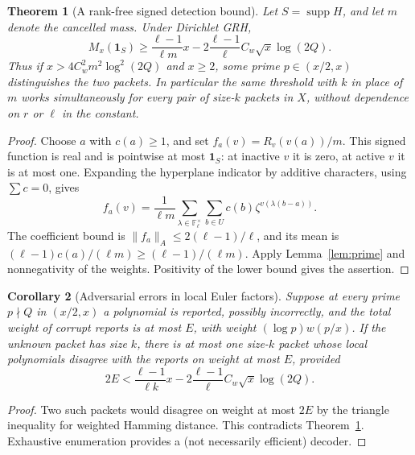 \documentclass[11pt]{article}
\newtheorem{theorem}{Theorem}[section]
\newtheorem{corollary}[theorem]{Corollary}
\theoremstyle{remark}\newtheorem{remark}[theorem]{Remark}
\newcommand{\F}{\mathbb F}
\newcommand{\supp}{\operatorname{supp}}
\newcommand{\ind}{\mathbf 1}
\begin{document}
\begin{theorem}[A rank-free signed detection bound]\label{thm:finite}
Let $S=\supp H$, and let $m$ denote the cancelled mass. Under Dirichlet GRH,
\begin{equation}\label{eq:finite}
 M_x(\ind_S)\ge \frac{\ell-1}{\ell m}x-2\frac{\ell-1}{\ell}C_w\sqrt x\log(2Q).
\end{equation}
Thus if $x>4 C_w^2m^2\log^2(2Q)$ and $x\ge2$, some prime $p\in(x/2,x)$ distinguishes the two packets. In particular the same threshold with $k$ in place of $m$ works simultaneously for every pair of size-$k$ packets in $X$, without dependence on $r$ or $\ell$ in the constant.
\end{theorem}
\begin{proof}
Choose $a$ with $c(a)\ge1$, and set $f_a(v)=R_v(v(a))/m$. This signed function is real and is pointwise at most $\ind_S$: at inactive $v$ it is zero, at active $v$ it is at most one. Expanding the hyperplane indicator by additive characters, using $\sum c=0$, gives
\[
 f_a(v)=\frac1{\ell m}\sum_{\lambda\in\F_\ell^\times}\sum_{b\in U}c(b)\zeta^{v(\lambda(b-a))}.
\]
The coefficient bound is $\|f_a\|_A\le 2(\ell-1)/\ell$, and its mean is $(\ell-1)c(a)/(\ell m)\ge(\ell-1)/(\ell m)$. Apply Lemma~\ref{lem:prime} and nonnegativity of the weights. Positivity of the lower bound gives the assertion.
\end{proof}

\begin{corollary}[Adversarial errors in local Euler factors]\label{cor:decode}
Suppose at every prime $p\nmid Q$ in $(x/2,x)$ a polynomial is reported, possibly incorrectly, and the total weight of corrupt reports is at most $E$, with weight $(\log p)w(p/x)$. If the unknown packet has size $k$, there is at most one size-$k$ packet whose local polynomials disagree with the reports on weight at most $E$, provided
\[
 2E<\frac{\ell-1}{\ell k}x-2\frac{\ell-1}{\ell}C_w\sqrt x\log(2Q).
\]
\end{corollary}
\begin{proof}
Two such packets would disagree on weight at most $2E$ by the triangle inequality for weighted Hamming distance. This contradicts Theorem~\ref{thm:finite}. Exhaustive enumeration provides a (not necessarily efficient) decoder.
\end{proof}
\end{document}
